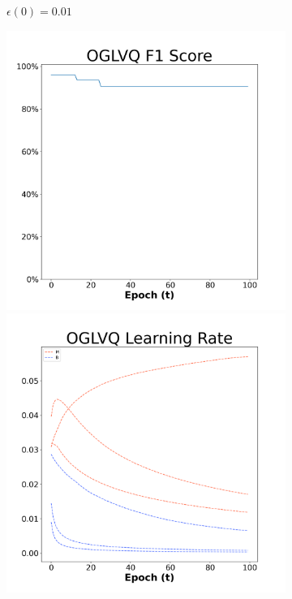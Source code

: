 \begin{figure}[H]
\begin{subfigure}{0.3\textwidth}
  \caption{$\epsilon(0)=0.01$}
\end{subfigure}\hfil %
\begin{subfigure}{0.3\textwidth}
  \includegraphics[width=\linewidth]{images/exper2/breast/OGLVQ_0.03_f1.png}
  \includegraphics[width=\linewidth]{images/exper2/breast/OGLVQ_0.03_lr.png}

\end{subfigure}
\end{figure}
